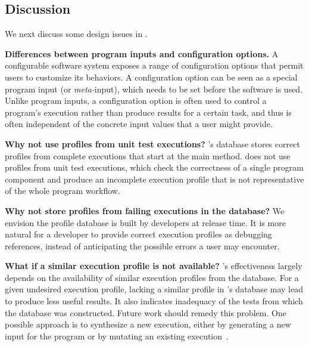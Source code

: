 \subsection{Discussion}

We next discuss some design issues in \ourtool.

\vspace{1mm}
\noindent \textbf{Differences between program inputs and configuration options.}
A configurable software system exposes a range of configuration
options that permit users to
customize its behaviors. %
A configuration option can be seen as a special program input
(or \textit{meta-}input), which needs to be set before the
software is used. Unlike program inputs, a configuration option is often
used to control a program's execution rather than
produce results for a certain task, and thus
is often independent of the concrete input values that a user might provide.


\vspace{1mm}
\noindent \textbf{Why not use profiles from unit test executions?}
\ourtool's database stores correct profiles from complete 
executions that start at the main method.
\ourtool does not use profiles from unit test executions, which check the
correctness
of a single program component and produce
an incomplete execution profile that is not representative of
the whole program workflow. 



\vspace{1mm}
\noindent \textbf{Why not store profiles from failing executions in the database?}
We envision the profile database is built by developers at release time.
It is more natural for a developer to provide correct execution
profiles as debugging references, instead of
anticipating the possible errors a user may encounter.


\vspace{1mm}
\noindent \textbf{What if a similar execution profile is not available?}
\ourtool's effectiveness largely depends on the availability of
similar execution profiles from the database. For a given undesired execution profile, lacking a similar
profile in \ourtool's database may lead \ourtool to produce
less useful results.  It also indicates inadequacy of the tests from
which the database was constructed.
Future work should remedy this problem. One
possible approach is to synthesize a new execution, either by
generating a new input for the program or by mutating an
existing execution~\cite{sumnerICSE2011}.


